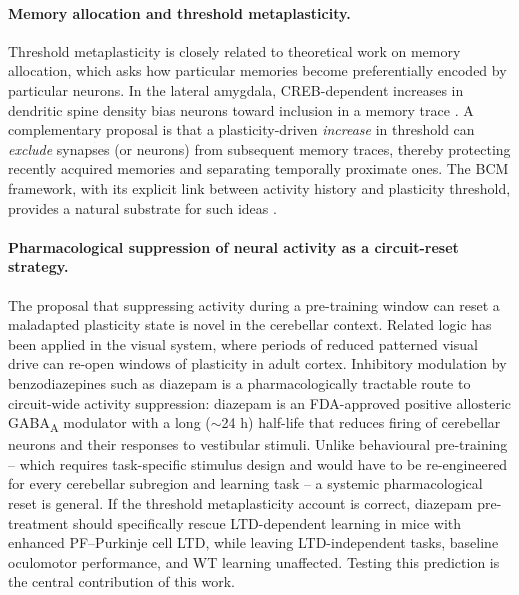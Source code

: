 \paragraph{Memory allocation and threshold metaplasticity.}
Threshold metaplasticity is closely related to theoretical work on memory allocation, which asks how particular memories become preferentially encoded by particular neurons. In the lateral amygdala, CREB-dependent increases in dendritic spine density bias neurons toward inclusion in a memory trace \cite{sargin2013creb}. A complementary proposal is that a plasticity-driven \emph{increase} in threshold can \emph{exclude} synapses (or neurons) from subsequent memory traces, thereby protecting recently acquired memories and separating temporally proximate ones. The BCM framework, with its explicit link between activity history and plasticity threshold, provides a natural substrate for such ideas \cite{abraham1996metaplasticity}.

\paragraph{Pharmacological suppression of neural activity as a circuit-reset strategy.}
The proposal that suppressing activity during a pre-training window can reset a maladapted plasticity state is novel in the cerebellar context. Related logic has been applied in the visual system, where periods of reduced patterned visual drive can re-open windows of plasticity in adult cortex. Inhibitory modulation by benzodiazepines such as diazepam is a pharmacologically tractable route to circuit-wide activity suppression: diazepam is an FDA-approved positive allosteric GABA\textsubscript{A} modulator with a long (\(\sim\)24 h) half-life that reduces firing of cerebellar neurons and their responses to vestibular stimuli. Unlike behavioural pre-training -- which requires task-specific stimulus design and would have to be re-engineered for every cerebellar subregion and learning task -- a systemic pharmacological reset is general. If the threshold metaplasticity account is correct, diazepam pre-treatment should specifically rescue LTD-dependent learning in mice with enhanced PF--Purkinje cell LTD, while leaving LTD-independent tasks, baseline oculomotor performance, and WT learning unaffected. Testing this prediction is the central contribution of this work.

